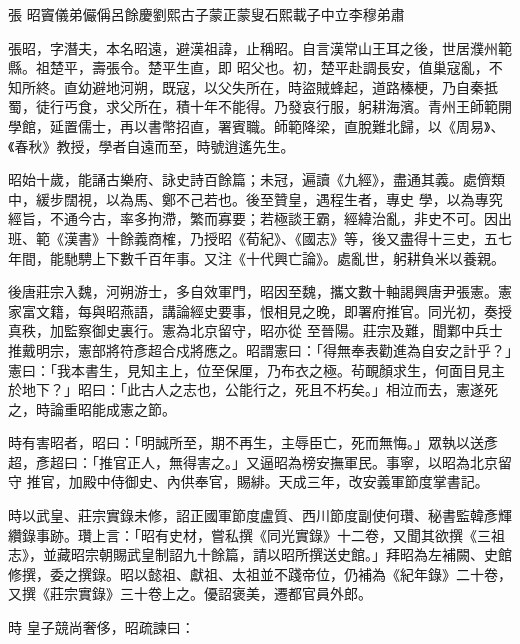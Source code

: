 
\begin{pinyinscope}

 張
 昭竇儀弟儼偁呂餘慶劉熙古子蒙正蒙叟石熙載子中立李穆弟肅



 張昭，字潛夫，本名昭遠，避漢祖諱，止稱昭。自言漢常山王耳之後，世居濮州範縣。祖楚平，壽張令。楚平生直，即
 昭父也。初，楚平赴調長安，值巢寇亂，不知所終。直幼避地河朔，既寇，以父失所在，時盜賊蜂起，道路榛梗，乃自秦抵蜀，徒行丐食，求父所在，積十年不能得。乃發哀行服，躬耕海濱。青州王師範開學館，延置儒士，再以書幣招直，署賓職。師範降梁，直脫難北歸，以《周易》、《春秋》教授，學者自遠而至，時號逍遙先生。



 昭始十歲，能誦古樂府、詠史詩百餘篇；未冠，遍讀《九經》，盡通其義。處儕類中，緩步闊視，以為馬、鄭不己若也。後至贊皇，遇程生者，專史
 學，以為專究經旨，不通今古，率多拘滯，繁而寡要；若極談王霸，經緯治亂，非史不可。因出班、範《漢書》十餘義商榷，乃授昭《荀紀》、《國志》等，後又盡得十三史，五七年間，能馳騁上下數千百年事。又注《十代興亡論》。處亂世，躬耕負米以養親。



 後唐莊宗入魏，河朔游士，多自效軍門，昭因至魏，攜文數十軸謁興唐尹張憲。憲家富文籍，每與昭燕語，講論經史要事，恨相見之晚，即署府推官。同光初，奏授真秩，加監察御史裏行。憲為北京留守，昭亦從
 至晉陽。莊宗及難，聞鄴中兵士推戴明宗，憲部將符彥超合戍將應之。昭謂憲曰：「得無奉表勸進為自安之計乎？」憲曰：「我本書生，見知主上，位至保厘，乃布衣之極。茍靦顏求生，何面目見主於地下？」昭曰：「此古人之志也，公能行之，死且不朽矣。」相泣而去，憲遂死之，時論重昭能成憲之節。



 時有害昭者，昭曰：「明誠所至，期不再生，主辱臣亡，死而無悔。」眾執以送彥超，彥超曰：「推官正人，無得害之。」又逼昭為榜安撫軍民。事寧，以昭為北京留守
 推官，加殿中侍御史、內供奉官，賜緋。天成三年，改安義軍節度掌書記。



 時以武皇、莊宗實錄未修，詔正國軍節度盧質、西川節度副使何瓚、秘書監韓彥輝纘錄事跡。瓚上言：「昭有史材，嘗私撰《同光實錄》十二卷，又聞其欲撰《三祖志》，並藏昭宗朝賜武皇制詔九十餘篇，請以昭所撰送史館。」拜昭為左補闕、史館修撰，委之撰錄。昭以懿祖、獻祖、太祖並不踐帝位，仍補為《紀年錄》二十卷，又撰《莊宗實錄》三十卷上之。優詔褒美，遷都官員外郎。



 時
 皇子競尚奢侈，昭疏諫曰：




\end{pinyinscope}
